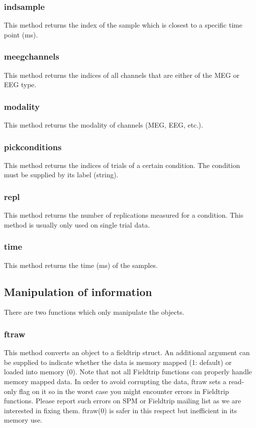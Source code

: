 \subsubsection{indsample}
This method returns the index of the sample which is closest to a
specific time point (ms).

\subsubsection{meegchannels}
This method returns the indices of all channels that are either of the
MEG or EEG type. 

\subsubsection{modality}
This method returns the modality of channels (MEG, EEG, etc.).

\subsubsection{pickconditions}
This method returns the indices of trials of a certain condition. The
condition must be supplied by its label (string).

\subsubsection{repl}
This method returns the number of replications measured for a
condition. This method is usually only used on single trial data.

\subsubsection{time}
This method returns the time (ms) of the samples.

\subsection{Manipulation of information}
There are two functions which only manipulate the objects. 

\subsubsection{ftraw}
This method converts an object to a fieldtrip struct. An additional
argument can be supplied to indicate whether the data is memory mapped
(1: default) or loaded into memory (0). Note that not all Fieldtrip functions
can properly handle memory mapped data. In order to avoid corrupting
the data, ftraw sets a read-only flag on it so in the worst case you might
encounter errors in Fieldtrip functions. Please report such errors on
SPM or Fieldtrip mailing list as we are interested in fixing them. ftraw(0) is 
safer in this respect but inefficient in its memory use. 


